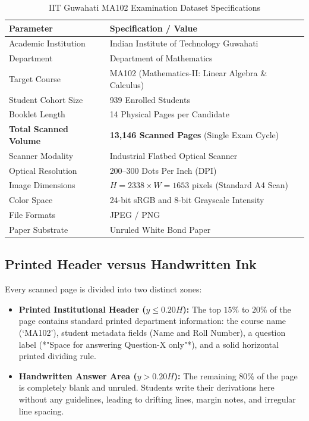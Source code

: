 \begin{table}[htbp]
\centering
\caption{IIT Guwahati MA102 Examination Dataset Specifications}
\label{tab:dataset_specs}
\vspace{0.2cm}
\small
\begin{tabular}{ll}
\toprule
\textbf{Parameter} & \textbf{Specification / Value} \\
\midrule
Academic Institution & Indian Institute of Technology Guwahati \\
Department & Department of Mathematics \\
Target Course & MA102 (Mathematics-II: Linear Algebra \& Calculus) \\
Student Cohort Size & 939 Enrolled Students \\
Booklet Length & 14 Physical Pages per Candidate \\
\textbf{Total Scanned Volume} & \textbf{13,146 Scanned Pages} (Single Exam Cycle) \\
Scanner Modality & Industrial Flatbed Optical Scanner \\
Optical Resolution & 200--300 Dots Per Inch (DPI) \\
Image Dimensions & $H = 2338 \times W = 1653$ pixels (Standard A4 Scan) \\
Color Space & 24-bit sRGB and 8-bit Grayscale Intensity \\
File Formats & JPEG / PNG \\
Paper Substrate & Unruled White Bond Paper \\
\bottomrule
\end{tabular}
\end{table}

\subsection{Printed Header versus Handwritten Ink}
Every scanned page is divided into two distinct zones:
\begin{itemize}
    \item \textbf{Printed Institutional Header ($y \le 0.20 H$):} The top $15\%$ to $20\%$ of the page contains standard printed department information: the course name (`MA102'), student metadata fields (Name and Roll Number), a question label (*"Space for answering Question-X only"*), and a solid horizontal printed dividing rule.
    \item \textbf{Handwritten Answer Area ($y > 0.20 H$):} The remaining $80\%$ of the page is completely blank and unruled. Students write their derivations here without any guidelines, leading to drifting lines, margin notes, and irregular line spacing.
\end{itemize}

